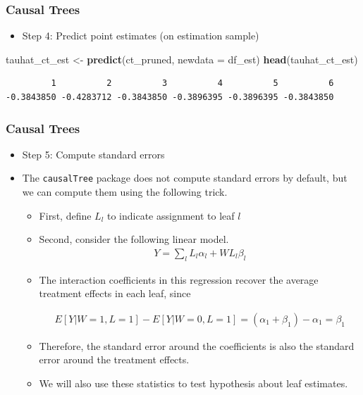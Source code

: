 \documentclass[
  shownotes,
  xcolor={svgnames},
  hyperref={colorlinks,citecolor=DarkBlue,linkcolor=DarkRed,urlcolor=DarkBlue}
  , aspectratio=169]{beamer}
\newenvironment{Shaded}{\begin{snugshade}}{\end{snugshade}}
\newcommand{\DataTypeTok}[1]{\textcolor[rgb]{0.13,0.29,0.53}{#1}}
\newcommand{\KeywordTok}[1]{\textcolor[rgb]{0.13,0.29,0.53}{\textbf{#1}}}
\newcommand{\NormalTok}[1]{#1}
\newcommand{\StringTok}[1]{\textcolor[rgb]{0.31,0.60,0.02}{#1}}
\begin{document}
\begin{frame}[fragile]
\frametitle{Causal Trees}

\begin{itemize}
\item Step 4: Predict point estimates (on estimation sample)
\end{itemize}



\begin{Shaded}
\begin{Highlighting}[]
\NormalTok{tauhat\_ct\_est \textless{}{-}}\StringTok{ }\KeywordTok{predict}\NormalTok{(ct\_pruned, }\DataTypeTok{newdata =}\NormalTok{ df\_est)}
\KeywordTok{head}\NormalTok{(tauhat\_ct\_est)}
\end{Highlighting}
\end{Shaded}

\begin{verbatim}
         1          2          3          4          5          6 
-0.3843850 -0.4283712 -0.3843850 -0.3896395 -0.3896395 -0.3843850 
\end{verbatim}

\end{frame}
\begin{frame}[fragile]
\frametitle{Causal Trees}

\begin{itemize}
\item Step 5: Compute standard errors
\item The \texttt{causalTree} package does not compute standard errors by default, but we can compute them using the following trick. 
\begin{itemize}
\item First, define $L_l$ to indicate assignment to leaf $l$
\item Second, consider the following linear model.
\begin{align}
  Y= \sum_l L_l \alpha_l + W L_l \beta_l
\end{align}
\item The interaction coefficients in this regression recover the average treatment effects in each leaf, since

\begin{align}
E[Y|W=1,L=1]-E[Y|W=0,L=1] = (\alpha_1+\beta_1)-\alpha_1=\beta_1
\end{align}

\item Therefore, the standard error around the coefficients is also the standard error around the treatment effects. 
\item We will also use these statistics to test hypothesis about leaf estimates.

\end{itemize}
\end{itemize}

\end{frame}
\end{document}
